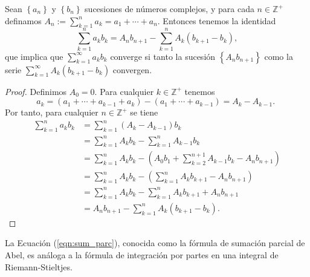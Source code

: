 \begin{lemma}\label{sum_parc}
  Sean $\left\{a_{n}\right\}$ y $\left\{b_{n}\right\}$ sucesiones de números complejos, y para cada $n \in \mathbb{Z}^{+}$ definamos $A_{n}:=\sum_{k=1}^{n} a_{k}=a_{1}+\cdots+a_{n}$. Entonces tenemos la identidad
  \begin{equation}\label{eqn:sum_parc}\sum_{k=1}^{n} a_{k} b_{k}=A_{n} b_{n+1}-\sum_{k=1}^{n} A_{k}\left(b_{k+1}-b_{k}\right),\end{equation}
  que implica que $\sum_{k=1}^{\infty} a_{k} b_{k}$ converge si tanto la sucesión $\left\{A_{n} b_{n+1}\right\}$ como la serie $\sum_{k=1}^{\infty} A_{k}\left(b_{k+1}-b_{k}\right)$ convergen.
\end{lemma}
\begin{proof}
  Definimos $A_{0}=0$. Para cualquier $k \in \mathbb{Z}^{+}$ tenemos
  $$
    a_{k}=\left(a_{1}+\cdots+a_{k-1}+a_{k}\right)-\left(a_{1}+\cdots+a_{k-1}\right)=A_{k}-A_{k-1} \text {. }
  $$
  Por tanto, para cualquier $n \in \mathbb{Z}^{+}$ se tiene
  $$
    \begin{aligned}
    \sum_{k=1}^{n} a_{k} b_{k} & =\sum_{k=1}^{n}\left(A_{k}-A_{k-1}\right) b_{k} \\
    & =\sum_{k=1}^{n} A_{k} b_{k}-\sum_{k=1}^{n} A_{k-1} b_{k} \\
    & =\sum_{k=1}^{n} A_{k} b_{k}-\left(A_{0} b_{1}+\sum_{k=2}^{n+1} A_{k-1} b_{k}-A_{n} b_{n+1}\right) \\
    & =\sum_{k=1}^{n} A_{k} b_{k}-\left(\sum_{k=1}^{n} A_{k} b_{k+1}-A_{n} b_{n+1}\right) \\
    & =\sum_{k=1}^{n} A_{k} b_{k}-\sum_{k=1}^{n} A_{k} b_{k+1}+A_{n} b_{n+1}\\
    & =A_{n} b_{n+1}-\sum_{k=1}^{n} A_{k}\left(b_{k+1}-b_{k}\right) \text {. }
    \end{aligned}
  $$
\end{proof}
\begin{remark}
  La Ecuación (\ref{eqn:sum_parc}), conocida como la fórmula de sumación parcial de Abel, es análoga a la fórmula de integración por partes en una integral de Riemann-Stieltjes.
\end{remark}


